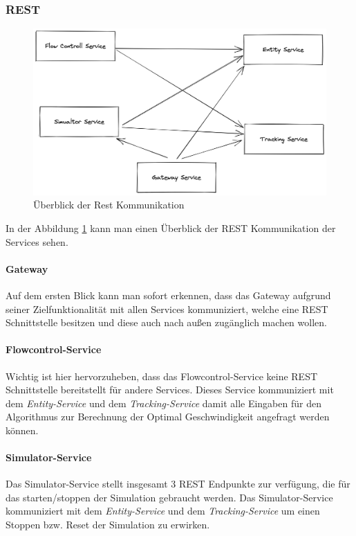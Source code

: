 \subsubsection{REST}

\begin{figure}[h]
	\centering
	\includegraphics[width=1.02\textwidth]{./figures/rest_communication.png}
	\caption{Überblick der Rest Kommunikation}
	\label{fig:kom_rest_overview}
\end{figure}

In der Abbildung \ref{fig:kom_rest_overview} kann man einen Überblick der REST Kommunikation der Services sehen. 

\paragraph{Gateway}
Auf dem ersten Blick kann man sofort erkennen, dass das Gateway aufgrund seiner Zielfunktionalität mit allen Services kommuniziert, welche eine REST Schnittstelle besitzen und diese auch nach außen zugänglich machen wollen.

\paragraph{Flowcontrol-Service}
Wichtig ist hier hervorzuheben, dass das Flowcontrol-Service keine REST Schnittstelle bereitstellt für andere Services. Dieses Service kommuniziert mit dem \textit{Entity-Service} und dem \textit{Tracking-Service} damit alle Eingaben für den Algorithmus zur Berechnung der Optimal Geschwindigkeit angefragt werden können.

\paragraph{Simulator-Service}
Das Simulator-Service stellt insgesamt 3 REST Endpunkte zur verfügung, die für das starten/stoppen der Simulation gebraucht werden. Das Simulator-Service kommuniziert mit dem \textit{Entity-Service} und dem \textit{Tracking-Service} um einen Stoppen bzw. Reset der Simulation zu erwirken.

